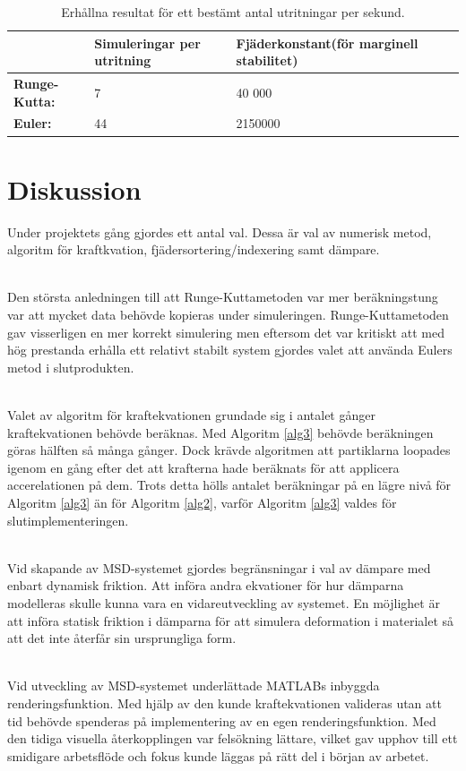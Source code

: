 \documentclass[a4paper,12pt,oneside,final,swedish]{extarticle}
\begin{document}
\begin{table}[htbp]
    \caption{Erhållna resultat för ett bestämt antal utritningar per sekund.}
    \label{table_example2}
    \begin{tabular*}{\hsize}{lllll}
      \hline %
       & \bfseries Simuleringar per utritning & \bfseries Fjäderkonstant(för marginell stabilitet)\\
      \hline
      \bfseries Runge-Kutta: & 7 & 40 000\\
      \bfseries Euler: & 44 & 2150000\\
      \hline
    \end{tabular*}
\end{table}
\section{Diskussion}
Under projektets gång gjordes ett antal val. Dessa är val av numerisk metod, algoritm för kraftkvation, fjädersortering/indexering samt dämpare.

\noindent\\Den största anledningen till att Runge-Kuttametoden var mer beräkningstung var att mycket data behövde kopieras under simuleringen. Runge-Kuttametoden gav visserligen en mer korrekt simulering men eftersom det var kritiskt att med hög prestanda erhålla ett relativt stabilt system gjordes valet att använda Eulers metod i slutprodukten.

\noindent\\Valet av algoritm för kraftekvationen grundade sig i antalet gånger kraftekvationen behövde beräknas. Med Algoritm \ref{alg3} behövde beräkningen göras hälften så många gånger. Dock krävde algoritmen att partiklarna loopades igenom en gång efter det att krafterna hade beräknats för att applicera accerelationen på dem. Trots detta hölls antalet beräkningar på en lägre nivå för Algoritm \ref{alg3} än för Algoritm \ref{alg2}, varför Algoritm \ref{alg3} valdes för slutimplementeringen.

\noindent\\Vid skapande av MSD-systemet gjordes begränsningar i val av dämpare med enbart dynamisk friktion. Att införa andra ekvationer för hur dämparna modelleras skulle kunna vara en vidareutveckling av systemet. En möjlighet är att införa statisk friktion i dämparna för att simulera deformation i materialet så att det inte återfår sin ursprungliga form.

\noindent\\Vid utveckling av MSD-systemet underlättade MATLABs inbyggda renderingsfunktion. Med hjälp av den kunde kraftekvationen valideras utan att tid behövde spenderas på implementering av en egen renderingsfunktion. Med den tidiga visuella återkopplingen var felsökning lättare, vilket gav upphov till ett smidigare arbetsflöde och fokus kunde läggas på rätt del i början av arbetet.
\end{document}
